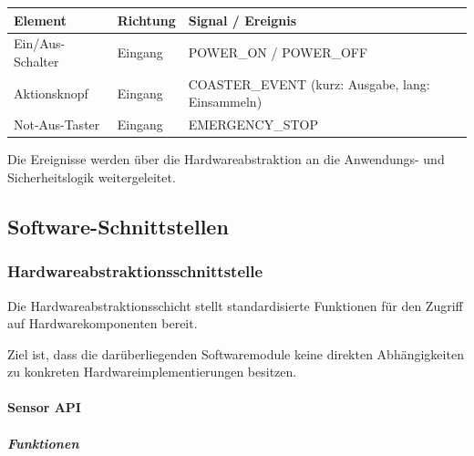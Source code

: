 \documentclass[
  a4paper,
  12pt,
  DIV=12,        %
  parskip=half,  %
  headings=small %
]{scrartcl}
\theoremstyle{definition}
\theoremstyle{definition}
\begin{document}
\begin{longtable}[]{@{}
  >{\raggedright\arraybackslash}p{}
  >{\raggedright\arraybackslash}p{}
  >{\raggedright\arraybackslash}p{}@{}}
\toprule\noalign{}
\begin{minipage}[b]{\linewidth}\raggedright
Element
\end{minipage} & \begin{minipage}[b]{\linewidth}\raggedright
Richtung
\end{minipage} & \begin{minipage}[b]{\linewidth}\raggedright
Signal / Ereignis
\end{minipage} \\
\midrule\noalign{}
\endhead
\bottomrule\noalign{}
\endlastfoot
Ein/Aus-Schalter & Eingang & POWER\_ON / POWER\_OFF \\
Aktionsknopf & Eingang & COASTER\_EVENT (kurz: Ausgabe, lang:
Einsammeln) \\
Not-Aus-Taster & Eingang & EMERGENCY\_STOP \\
\end{longtable}

Die Ereignisse werden über die Hardwareabstraktion an die Anwendungs-
und Sicherheitslogik weitergeleitet.

\subsection{Software-Schnittstellen}\label{software-schnittstellen}

\subsubsection{Hardwareabstraktionsschnittstelle}\label{hardwareabstraktionsschnittstelle}

Die Hardwareabstraktionsschicht stellt standardisierte Funktionen für
den Zugriff auf Hardwarekomponenten bereit.

Ziel ist, dass die darüberliegenden Softwaremodule keine direkten
Abhängigkeiten zu konkreten Hardwareimplementierungen besitzen.

\paragraph{Sensor API}\label{sensor-api}

\subparagraph{Funktionen}\label{funktionen-5}
\end{document}
